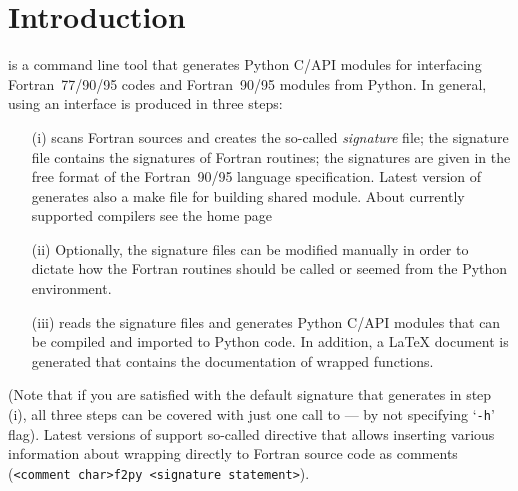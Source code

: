 
\section{Introduction}
\label{sec:intro}

\fpy is a command line tool that generates Python C/API modules for
interfacing Fortran~77/90/95 codes and Fortran~90/95 modules from
Python.  In general, using \fpy an
interface is produced in three steps:
\begin{itemize}
\item[(i)] \fpy scans Fortran sources and creates the so-called
  \emph{signature} file; the signature file contains the signatures of
  Fortran routines; the signatures are given in the free format of the
  Fortran~90/95 language specification. Latest version of \fpy
  generates also a make file for building shared module.  
  About currently supported compilers see the \fpy home page
\item[(ii)] Optionally, the signature files can be modified manually
  in order to dictate how the Fortran routines should be called or
  seemed from the Python environment.
\item[(iii)] \fpy reads the signature files and generates Python C/API
  modules that can be compiled and imported to Python code. In
  addition, a LaTeX document is generated that contains the
  documentation of wrapped functions.
\end{itemize}
(Note that if you are satisfied with the default signature that \fpy
generates in step (i), all three steps can be covered with just
one call to \fpy --- by not specifying `\texttt{-h}' flag).
Latest versions of \fpy support so-called \fpy directive that allows
inserting various information about wrapping directly to Fortran
source code as comments (\texttt{<comment char>f2py  <signature statement>}).

